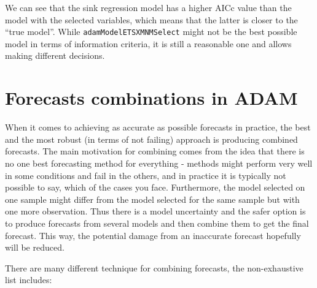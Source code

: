 \documentclass[
]{book}
\theoremstyle{definition}
\theoremstyle{definition}
\theoremstyle{definition}
\theoremstyle{definition}
\theoremstyle{remark}
\begin{document}
We can see that the sink regression model has a higher AICc value than the model with the selected variables, which means that the latter is closer to the ``true model''. While \texttt{adamModelETSXMNMSelect} might not be the best possible model in terms of information criteria, it is still a reasonable one and allows making different decisions.

\hypertarget{ADAMCombinations}{%
\section{Forecasts combinations in ADAM}\label{ADAMCombinations}}

When it comes to achieving as accurate as possible forecasts in practice, the best and the most robust (in terms of not failing) approach is producing combined forecasts. The main motivation for combining comes from the idea that there is no one best forecasting method for everything - methods might perform very well in some conditions and fail in the others, and in practice it is typically not possible to say, which of the cases you face. Furthermore, the model selected on one sample might differ from the model selected for the same sample but with one more observation. Thus there is a model uncertainty \citep[as defined by][]{Chatfield1996} and the safer option is to produce forecasts from several models and then combine them to get the final forecast. This way, the potential damage from an inaccurate forecast hopefully will be reduced.

There are many different technique for combining forecasts, the non-exhaustive list includes:
\end{document}
